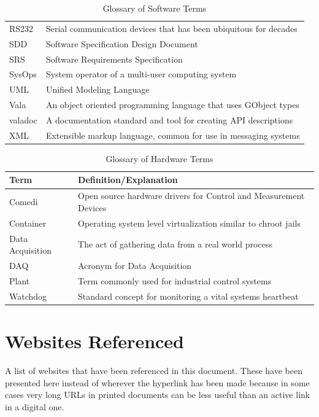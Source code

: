 \documentclass[11pt]{article}
\begin{document}
\begin{table}[H]
\begin{tabular}{l p{10cm}}
        RS232 & Serial communication devices that has been ubiquitous for decades \\
        SDD & Software Specification Design Document \\
        SRS & Software Requirements Specification \\
        SysOps & System operator of a multi-user computing system \\
        UML & Unified Modeling Language \\
        Vala & An object oriented programming language that uses GObject types \\
        valadoc & A documentation standard and tool for creating API descriptions \\
        XML & Extensible markup language, common for use in messaging systems \\
        \bottomrule
      \end{tabular}
      \caption{Glossary of Software Terms}\label{tab:gloss:sw}
    \end{table}

    \begin{table}[H]
      \centering
      \begin{tabular}{l p{10cm}}
        \toprule
        Term & Definition/Explanation \\ [0.5ex]
        \midrule
        Comedi & Open source hardware drivers for Control and Measurement Devices \\
        Container & Operating system level virtualization similar to chroot jails \\
        Data Acquisition & The act of gathering data from a real world process \\
        DAQ & Acronym for Data Acquisition \\
        Plant & Term commonly used for industrial control systems \\
        Watchdog & Standard concept for monitoring a vital systems heartbeat \\
        \bottomrule
      \end{tabular}
      \caption{Glossary of Hardware Terms}\label{tab:gloss:hw}
    \end{table}

  \section{Websites Referenced}\label{app:websites}

    A list of websites that have been referenced in this document. These have
    been presented here instead of wherever the hyperlink has been made
    because in some cases very long URLs in printed documents can be less useful
    than an active link in a digital one.
\end{document}
